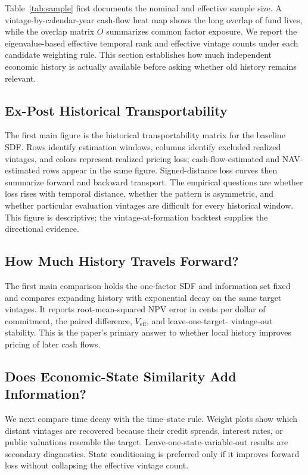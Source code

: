 \documentclass[11pt]{article}
\begin{document}
Table~\ref{tab:sample} first documents the nominal and effective sample size.
A vintage-by-calendar-year cash-flow heat map shows the long overlap of fund
lives, while the overlap matrix $O$ summarizes common factor exposure. We
report the eigenvalue-based effective temporal rank and effective vintage
counts under each candidate weighting rule. This section establishes how much
independent economic history is actually available before asking whether old
history remains relevant.

\subsection{Ex-Post Historical Transportability}

The first main figure is the historical transportability matrix for the
baseline SDF. Rows identify estimation windows, columns identify excluded
realized vintages, and colors represent realized pricing loss;
cash-flow-estimated and NAV-estimated rows appear in the same figure.
Signed-distance
loss curves then summarize forward and backward transport. The empirical
questions are whether loss rises with temporal distance, whether the pattern is
asymmetric, and whether particular evaluation vintages are difficult for every
historical window. This figure is descriptive; the vintage-at-formation
backtest supplies the directional evidence.

\subsection{How Much History Travels Forward?}

The first main comparison holds the one-factor SDF and information set
fixed and compares expanding history with exponential decay on the same target
vintages. It reports root-mean-squared NPV error in cents per dollar of
commitment, the paired difference, $V_{\mathrm{eff}}$, and leave-one-target-
vintage-out stability. This is the paper's primary answer to whether local
history improves pricing of later cash flows.

\subsection{Does Economic-State Similarity Add Information?}

We next compare time decay with the time--state rule. Weight plots show which
distant vintages are recovered because their credit spreads, interest rates,
or public valuations resemble the target. Leave-one-state-variable-out results
are secondary diagnostics. State conditioning is preferred only if it improves
forward loss without collapsing the effective vintage count.
\end{document}

